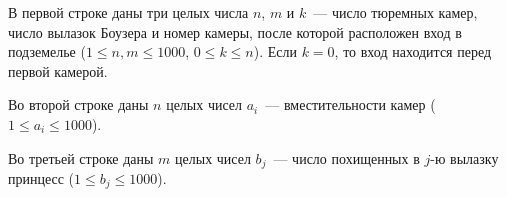 В первой строке даны три целых числа $n$, $m$ и $k$~--- число тюремных камер, число вылазок Боузера и номер камеры, после которой расположен вход в подземелье ($1 \le n, m \le 1000$, $0 \le k \le n$). Если $k = 0$, то вход находится перед первой камерой.

Во второй строке даны $n$ целых чисел $a_i$~--- вместительности камер ($1 \le a_i \le 1000$).

Во третьей строке даны $m$ целых чисел $b_j$~--- число похищенных в $j$-ю вылазку принцесс ($1 \le b_j \le 1000$).